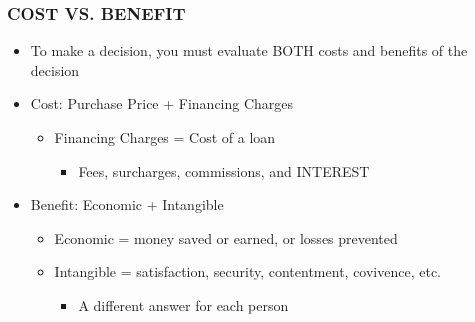 \documentclass[12pt]{article}
\begin{document}
            \subsubsection{COST VS. BENEFIT}
                \begin{itemize}
                    \item To make a decision, you must evaluate BOTH costs and benefits of the decision
                    \item Cost: Purchase Price + Financing Charges
                        \begin{itemize}
                            \item Financing Charges = Cost of a loan
                                \begin{itemize}
                                    \item Fees, surcharges, commissions, and INTEREST
                                \end{itemize}
                        \end{itemize}
                    \item Benefit: Economic + Intangible
                        \begin{itemize}
                            \item Economic = money saved or earned, or losses prevented
                            \item Intangible = satisfaction, security, contentment, covivence, etc.
                                \begin{itemize}
                                    \item A different answer for each person
                                \end{itemize}
                        \end{itemize}
                \end{itemize}
\end{document}

